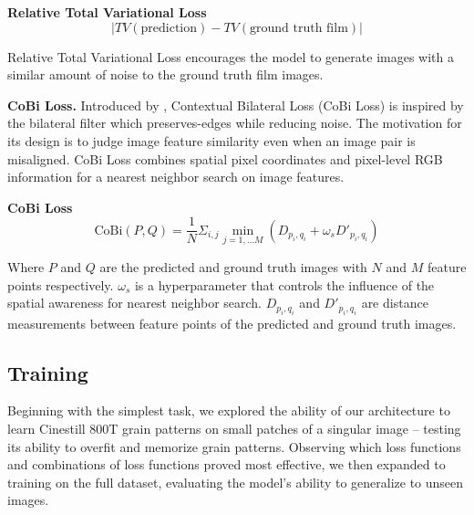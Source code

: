 \begin{definition}
\textbf{Relative Total Variational Loss} 
\begin{equation}
| TV(\text{prediction}) - TV(\text{ground truth film})| 
\end{equation}
\end{definition}

Relative Total Variational Loss encourages the model to generate images with a similar amount of noise to the ground truth film images.

\textbf{CoBi Loss.} Introduced by \cite{zoom-to-learn}, Contextual Bilateral Loss (CoBi Loss) is inspired by the bilateral filter \cite{bilateral-filter} which preserves-edges while reducing noise. The motivation for its design is to judge image feature similarity even when an image pair is misaligned. CoBi Loss combines spatial pixel coordinates and pixel-level RGB information for a nearest neighbor search on image features. 

\begin{definition}
  \textbf{CoBi Loss}
\begin{equation}
  \text{CoBi}(P, Q) = \frac{1}{N}\Sigma_{i,j}\min_{j=1,...M} (D_{p_i,q_i} + \omega_s D'_{p_i, q_i})
\end{equation}
\end{definition}

Where $P$ and $Q$ are the predicted and ground truth images with $N$ and $M$ feature points respectively. $\omega_s$ is a hyperparameter that controls the influence of the spatial awareness for nearest neighbor search. $D_{p_i,q_i}$ and $D'_{p_i,q_i}$ are distance measurements between feature points of the predicted and ground truth images. 


\subsection{Training}
\label{subsec:training}



Beginning with the simplest task, we explored the ability of our architecture to learn Cinestill 800T grain patterns on small patches of a singular image -- testing its ability to overfit and memorize grain patterns. Observing which loss functions and combinations of loss functions proved most effective, we then expanded to training on the full dataset, evaluating the model's ability to generalize to unseen images.


